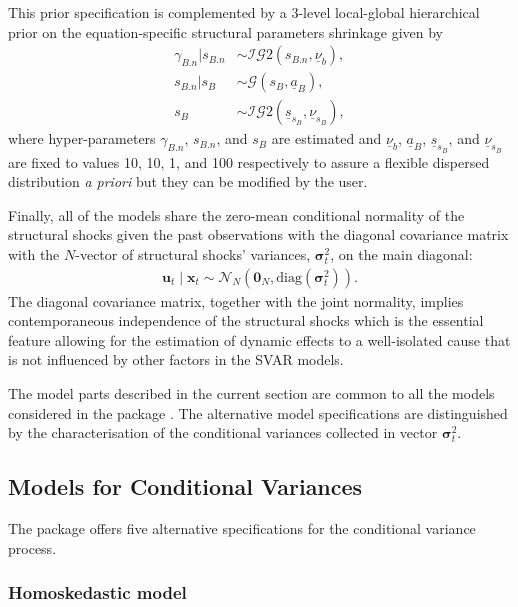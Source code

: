 \documentclass[
  nojss]{jss}
\begin{document}
This prior specification is complemented by a 3-level local-global
hierarchical prior on the equation-specific structural parameters
shrinkage given by \begin{align}
\gamma_{B.n} | s_{B.n}  &\sim\mathcal{IG}2\left(s_{B.n}, \underline{\nu}_b\right),\\
s_{B.n} | s_{B} &\sim\mathcal{G}\left(s_{B}, \underline{a}_B\right),\\
s_{B} &\sim\mathcal{IG}2\left(\underline{s}_{s_B}, \underline{\nu}_{s_B}\right),
\end{align} where hyper-parameters \(\gamma_{B.n}\), \(s_{B.n}\), and
\(s_{B}\) are estimated and \(\underline{\nu}_b\), \(\underline{a}_B\),
\(\underline{s}_{s_B}\), and \(\underline{\nu}_{s_B}\) are fixed to
values 10, 10, 1, and 100 respectively to assure a flexible dispersed
distribution \emph{a priori} but they can be modified by the user.

Finally, all of the models share the zero-mean conditional normality of
the structural shocks given the past observations with the diagonal
covariance matrix with the \(N\)-vector of structural shocks' variances,
\(\boldsymbol{\sigma}_t^2\), on the main diagonal: \begin{align}
\mathbf{u}_t\mid\mathbf{x}_t \sim\mathcal{N}_{N}\left( \mathbf{0}_N, \text{diag}\left(\boldsymbol{\sigma}_t^2\right) \right).
\end{align} The diagonal covariance matrix, together with the joint
normality, implies contemporaneous independence of the structural shocks
which is the essential feature allowing for the estimation of dynamic
effects to a well-isolated cause that is not influenced by other factors
in the SVAR models.

The model parts described in the current section are common to all the
models considered in the package . The alternative model
specifications are distinguished by the characterisation of the
conditional variances collected in vector \(\boldsymbol{\sigma}_t^2\).

\subsection{Models for Conditional Variances}\label{ssec:variances}

The  package offers five alternative specifications for the
conditional variance process.

\subsubsection{Homoskedastic model}
\end{document}
